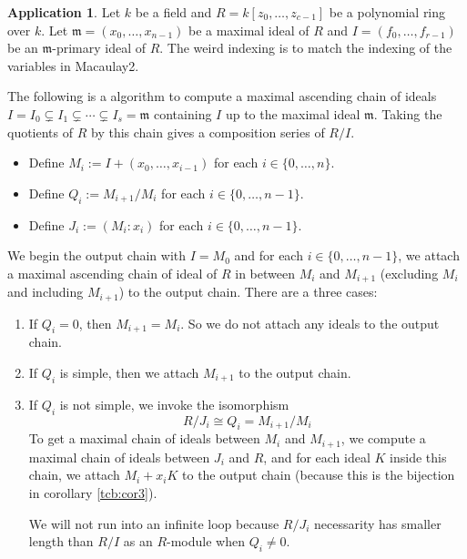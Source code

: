 \documentclass[a4paper,10pt]{article}
\makeatletter
\theoremstyle{definition}
\newtheorem{application}[tcb@cnt@theorem]{Application}
\newcommand\cref[2][blue!60!black]{corollary \ref{tcb:#2}}
\makeatother
\begin{document}
\begin{application}
Let $k$ be a field and $R=k[z_0,\dots,z_{c-1}]$ be a polynomial ring over $k$.
Let $\mathfrak{m}=(x_0,\dots,x_{n-1})$ be a maximal ideal of $R$
and $I=(f_0,\dots,f_{r-1})$ be an $\mathfrak{m}$-primary ideal of $R$.
The weird indexing is to match the indexing of the variables in Macaulay2.

The following is a algorithm to compute a maximal ascending chain of ideals 
$I=I_0\subsetneq I_1\subsetneq\cdots\subsetneq I_s=\mathfrak{m}$
containing $I$ up to the maximal ideal $\mathfrak{m}$.
Taking the quotients of $R$ by this chain gives a composition series of $R/I$.
\begin{itemize}
\item
Define $M_i:=I+(x_0,\dots,x_{i-1})$ for each $i\in\{0,\dots,n\}$.
\item
Define $Q_i:=M_{i+1}/M_i$ for each $i\in\{0,\dots,n-1\}$.
\item 
Define $J_i:=(M_i:x_i)$ for each $i\in\{0,\dots,n-1\}$.
\end{itemize}
We begin the output chain with $I=M_0$ and for each $i\in\{0,\dots,n-1\}$, 
we attach a maximal ascending chain of ideal of $R$ in between $M_i$ and 
$M_{i+1}$ (excluding $M_i$ and including $M_{i+1}$) to the output chain.
There are a three cases:
\begin{enumerate}[label=Case \arabic*.,align=left]
\item
If $Q_i=0$, then $M_{i+1}=M_i$.
So we do not attach any ideals to the output chain.
\item
If $Q_i$ is simple, then we attach $M_{i+1}$ to the output chain.
\item 
If $Q_i$ is not simple, we invoke the isomorphism 
\begin{equation*}
R/J_i\cong Q_i=M_{i+1}/M_i
\end{equation*}
To get a maximal chain of ideals between $M_i$ and $M_{i+1}$,
we compute a maximal chain of ideals between $J_i$ and $R$, 
and for each ideal $K$ inside this chain, we attach 
$M_i+x_iK$ to the output chain (because this is the bijection in \cref{cor3}).

We will not run into an infinite loop because $R/J_i$ necessarity has 
smaller length than $R/I$ as an $R$-module when $Q_i\not=0$.
\end{enumerate}
\end{application}
\end{document}
